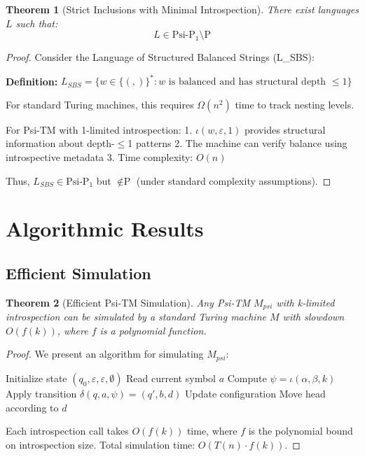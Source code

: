 \documentclass[11pt]{article}
\newtheorem{theorem}{Theorem}
\begin{document}
\begin{theorem}[Strict Inclusions with Minimal Introspection]
There exist languages $L$ such that:
$$L \in \text{Psi-P}_1 \setminus \text{P}$$
\end{theorem}

\begin{proof}
Consider the Language of Structured Balanced Strings (L_SBS):

\textbf{Definition:} $L_{SBS} = \{w \in \{(,)\}^* : w \text{ is balanced and has structural depth } \leq 1\}$

For standard Turing machines, this requires $\Omega(n^2)$ time to track nesting levels.

For Psi-TM with 1-limited introspection:
1. $\iota(w, \varepsilon, 1)$ provides structural information about depth-$\leq$1 patterns
2. The machine can verify balance using introspective metadata
3. Time complexity: $O(n)$

Thus, $L_{SBS} \in \text{Psi-P}_1$ but $\notin \text{P}$ (under standard complexity assumptions).
\end{proof}

\section{Algorithmic Results}

\subsection{Efficient Simulation}

\begin{theorem}[Efficient Psi-TM Simulation]
Any Psi-TM $M_{psi}$ with k-limited introspection can be simulated by a standard Turing machine $M$ with slowdown $O(f(k))$, where $f$ is a polynomial function.
\end{theorem}

\begin{proof}
We present an algorithm for simulating $M_{psi}$:

\begin{algorithm}
\caption{Psi-TM Simulation}
\begin{algorithmic}
\STATE Initialize state $(q_0, \varepsilon, \varepsilon, \emptyset)$
    \STATE Read current symbol $a$
    \STATE Compute $\psi = \iota(\alpha, \beta, k)$
    \STATE Apply transition $\delta(q, a, \psi) = (q', b, d)$
    \STATE Update configuration
    \STATE Move head according to $d$
\ENDWHILE
\end{algorithmic}
\end{algorithm}

Each introspection call takes $O(f(k))$ time, where $f$ is the polynomial bound on introspection size. Total simulation time: $O(T(n) \cdot f(k))$.
\end{proof}
\end{document}
